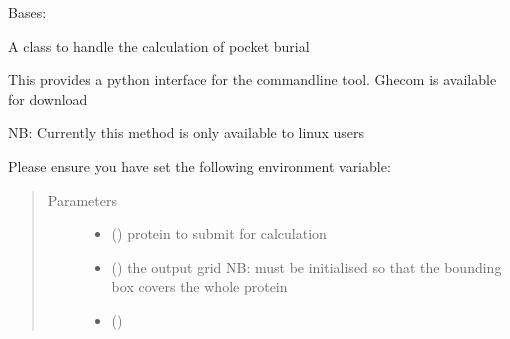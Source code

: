 \documentclass[letterpaper,10pt,english]{sphinxmanual}
\begin{document}
\begin{fulllineitems}
\label{\detokenize{calculation_api:hotspots.calculation.Buriedness}}
Bases: 

A class to handle the calculation of pocket burial

This provides a python interface for the command\sphinxhyphen{}line tool.
Ghecom is available for download 

NB: Currently this method is only available to linux users

Please ensure you have set the following environment variable:

\begin{sphinxVerbatim}[commandchars=\\\{\}]
 
\end{sphinxVerbatim}
\begin{quote}\begin{description}
\item[{Parameters}] \leavevmode\begin{itemize}
\item {} 
 () \textendash{} protein to submit for calculation

\item {} 
 () \textendash{} the output grid NB: must be initialised so that the bounding box covers the whole protein

\item {} 
 () \textendash{} 

\end{itemize}

\end{description}\end{quote}


\end{fulllineitems}
\end{document}
